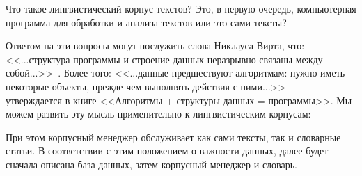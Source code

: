 Что такое лингвистический корпус текстов? Это, в первую очередь, компьютерная программа для обработки и анализа текстов или это сами тексты? 

Ответом на эти вопросы могут послужить слова Никлауса Вирта, что: 
<<...структура программы и строение данных неразрывно связаны между собой...>>~\cite[с.~9]{Wirth1989AlgorithmsAndDataStructure}. 
Более того:   
<<...данные предшествуют алгоритмам: нужно иметь некоторые объекты, 
прежде чем выполнять действия с ними...>>~\cite[с.~8]{Wirth1985Algorithms+} 
-- утверждается в книге <<Алгоритмы + структуры данных = программы>>.
Мы можем развить эту мысль применительно к лингвистическим корпусам:
        

\noindent
При этом корпусный менеджер обслуживает как сами тексты, так и словарные статьи. 
В соответствии с этим положением о важности данных, далее будет  
сначала описана база данных, затем корпусный менеджер и словарь.
